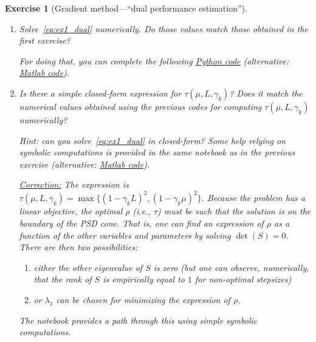 \documentclass[11pt,a4paper]{article}
\newcommand{\correction}[1]{{{\color{blue}\underline{Correction:} #1}}}
\newcommand{\correction}[1]{}
\newtheorem{exercise}{Exercise}
\begin{document}
\begin{exercise}[Gradient method---``dual performance estimation'']
\begin{enumerate}
An advantage of this approach is that it allows to easily obtain the dual formulations using symbolic computation (see, e.g., \href{https://github.com/PerformanceEstimation/Learning-Performance-Estimation/blob/main/codes/Jupyter/Exercise02.ipynb}{Python this notebook}, or this \href{https://github.com/PerformanceEstimation/Learning-Performance-Estimation/blob/main/Codes/Matlab/Exercise2_symbolicalLMI.m}{Matlab file}).
		
		\correction{Because all expressions in the Lagrangian are quadratics in $(x_k-x_\star,g_k)$ and linear in $f_k-f_\star$, the gradient and Hessian of the Lagrangian respectively with respect to $f_k$ and to $(x_k,g_k)$ actually corresponds to the matrices $s$ and $S$ such that \[\mathrm{Trace}(-SG)+ s F=\mathcal{L}(x_k,g_k,f_k,x_\star,f_\star;\lambda_1,\lambda_2,\rho),\] where $G$ is the previously defined Gram matrix~\eqref{ex1:eq:GRAM}.}
		
	
	\item Solve~\eqref{eq:ex1_dual} numerically. Do those values match those obtained in the first exercise? 
	
	For doing that, you can complete the following \href{https://github.com/PerformanceEstimation/Learning-Performance-Estimation/tree/main/Codes/Jupyter/Exercise02.ipynb}{Python code} (alternative: \href{https://github.com/PerformanceEstimation/Learning-Performance-Estimation/blob/main/Codes/Matlab/Exercise2.m}{Matlab code}).

	\item Is there a simple closed-form expression for $\tau(\mu,L,\gamma_k)$? Does it match the numerical values obtained using the previous codes for computing $\tau(\mu,L,\gamma_k)$ numerically?
	
	Hint: can you solve~\eqref{eq:ex1_dual}	in closed-form?	Some help relying on symbolic computations is provided in the same notebook as in the previous exercise (alternative: \href{https://github.com/PerformanceEstimation/Learning-Performance-Estimation/blob/main/Codes/Matlab/Exercise2_closedform.m}{Matlab code}).
	
	
	
	\correction{The expression is $\tau(\mu,L,\gamma_k)=\max\{(1-\gamma_k L)^2,(1-\gamma_k\mu)^2\}$. Because the problem has a linear objective, the optimal $\rho$ (i.e., $\tau$) must be such that the solution is on the boundary of the PSD cone. That is, one can find an expression of $\rho$ as a function of the other variables and parameters by solving $\det(S)=0$. There are then two possibilities:
	\begin{enumerate}
	\item either the other eigenvalue of $S$ is zero (but one can observe, numerically, that the rank of $S$ is empirically equal to $1$ for non-optimal stepsizes)
	\item or $\lambda_1$ can be chosen for minimizing the expression of $\rho$.
	\end{enumerate}
The notebook provides a path through this using simple symbolic computations.	
}
	

\end{enumerate}
\end{exercise}
\end{document}
